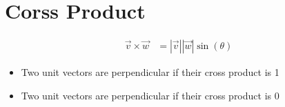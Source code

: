 \section{Corss Product}

  \begin{align}
    \vec{v} \times \vec{w} &= \left| \vec{v} \right| \left| \vec{w} \right| \sin\left( \theta \right)
  \end{align}

  \begin{itemize}
    \item Two unit vectors are perpendicular if their cross product is 1
    \item Two unit vectors are perpendicular if their cross product is 0
  \end{itemize}